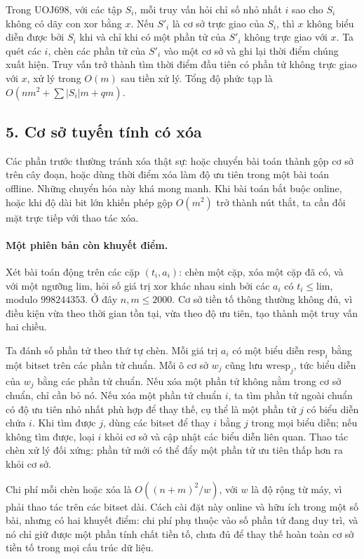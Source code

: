 \documentclass[11pt]{article}
\begin{document}
Trong UOJ698, với các tập \(S_i\), mỗi truy vấn hỏi chỉ số nhỏ nhất \(i\) sao
cho \(S_i\) không có dãy con xor bằng \(x\). Nếu \(S'_i\) là cơ sở trực giao
của \(S_i\), thì \(x\) không biểu diễn được bởi \(S_i\) khi và chỉ khi có một
phần tử của \(S'_i\) không trực giao với \(x\). Ta quét các \(i\), chèn các
phần tử của \(S'_i\) vào một cơ sở và ghi lại thời điểm chúng xuất hiện. Truy
vấn trở thành tìm thời điểm đầu tiên có phần tử không trực giao với \(x\), xử
lý trong \(O(m)\) sau tiền xử lý. Tổng độ phức tạp là
\(O(nm^2+\sum |S_i|m+qm)\).

\subsection*{5. Cơ sở tuyến tính có xóa}

Các phần trước thường tránh xóa thật sự: hoặc chuyển bài toán thành gộp cơ sở
trên cây đoạn, hoặc dùng thời điểm xóa làm độ ưu tiên trong một bài toán offline.
Những chuyển hóa này khá mong manh. Khi bài toán bắt buộc online, hoặc khi độ
dài bit lớn khiến phép gộp \(O(m^2)\) trở thành nút thắt, ta cần đối mặt trực
tiếp với thao tác xóa.

\paragraph{Một phiên bản còn khuyết điểm.}
Xét bài toán động trên các cặp \((t_i,a_i)\): chèn một cặp, xóa một cặp đã có,
và với một ngưỡng \(\mathrm{lim}\), hỏi số giá trị xor khác nhau sinh bởi các
\(a_i\) có \(t_i\le \mathrm{lim}\), modulo \(998244353\). Ở đây \(n,m\le2000\).
Cơ sở tiền tố thông thường không đủ, vì điều kiện vừa theo thời gian tồn tại,
vừa theo độ ưu tiên, tạo thành một truy vấn hai chiều.

Ta đánh số phần tử theo thứ tự chèn. Mỗi giá trị \(a_i\) có một biểu diễn
\(\mathrm{resp}_i\) bằng một bitset trên các phần tử chuẩn. Mỗi ô cơ sở
\(w_j\) cũng lưu \(\mathrm{wresp}_j\), tức biểu diễn của \(w_j\) bằng các phần
tử chuẩn. Nếu xóa một phần tử không nằm trong cơ sở chuẩn, chỉ cần bỏ nó. Nếu
xóa một phần tử chuẩn \(i\), ta tìm phần tử ngoài chuẩn có độ ưu tiên nhỏ nhất
phù hợp để thay thế, cụ thể là một phần tử \(j\) có biểu diễn chứa \(i\). Khi
tìm được \(j\), dùng các bitset để thay \(i\) bằng \(j\) trong mọi biểu diễn;
nếu không tìm được, loại \(i\) khỏi cơ sở và cập nhật các biểu diễn liên quan.
Thao tác chèn xử lý đối xứng: phần tử mới có thể đẩy một phần tử ưu tiên thấp
hơn ra khỏi cơ sở.

Chi phí mỗi chèn hoặc xóa là \(O((n+m)^2 / w)\), với \(w\) là độ rộng từ máy,
vì phải thao tác trên các bitset dài. Cách cài đặt này online và hữu ích trong
một số bài, nhưng có hai khuyết điểm: chi phí phụ thuộc vào số phần tử đang
duy trì, và nó chỉ giữ được một phần tính chất tiền tố, chưa đủ để thay thế
hoàn toàn cơ sở tiền tố trong mọi cấu trúc dữ liệu.
\end{document}
